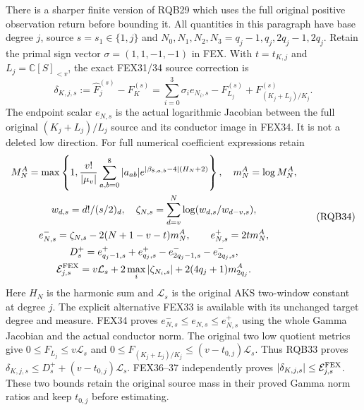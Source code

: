 \documentclass[10pt]{article}
\begin{document}
There is a sharper finite version of RQB29 which uses the full original
positive observation return before bounding it. All quantities in this
paragraph have base degree $j$, source $s=s_1\in\{1,j\}$ and
$N_0,N_1,N_2,N_3=q_j-1,q_j,2q_j-1,2q_j$.
Retain the primal sign vector $\sigma=(1,1,-1,-1)$ in FEX.
With $t=t_{K,j}$ and $L_j=\mathbb C[S]_{<v}$, the exact FEX31/34
source correction is
\[
 \delta_{K,j,s}:=\widehat F_j^{(s)}-F_K^{(s)}
       =\sum_{i=0}^3\sigma_i e_{N_i,s}
                    -F_{L_j}^{(s)}+F_{(K_j+L_j)/K_j}^{(s)} .
 \tag{RQB33}
\]
The endpoint scalar $e_{N,s}$ is the actual logarithmic Jacobian
between the full original $(K_j+L_j)/L_j$ source and its conductor
image in FEX34. It is not a deleted low direction. For full numerical
coefficient expressions retain
\[
\begin{gathered}
 M_N^A=\max\left\{1,\frac{v!}{|\mu_v|}
       \sum_{a,b=0}^8|a_{ab}|
         e^{|\beta_{8,a,b}-4|(H_N+2)}\right\},\quad m_N^A=\log M_N^A,\\
 w_{d,s}=d!/(s/2)_d,\quad
 \zeta_{N,s}=\sum_{d=v}^N\log(w_{d,s}/w_{d-v,s}),\\
 e^-_{N,s}=\zeta_{N,s}-2(N+1-v-t)m_N^A,\qquad
 e^+_{N,s}=2t m_N^A,\\
 D_s^+=e^+_{q_j-1,s}+e^+_{q_j,s}
                    -e^-_{2q_j-1,s}-e^-_{2q_j,s},\\
 \mathcal E_{j,s}^{\rm FEX}
       =v\mathcal L_s+2\max_i|\zeta_{N_i,s}|
                           +2(4q_j+1)m_{2q_j}^A .
\end{gathered}\tag{RQB34}
\]
Here $H_N$ is the harmonic sum and $\mathcal L_s$ is the original
AKS two-window constant at degree $j$. The explicit alternative
FEX33 is available with its unchanged target degree and measure.
FEX34 proves $e^-_{N,s}\le e_{N,s}\le e^+_{N,s}$ using the
whole Gamma Jacobian and the actual conductor norm.
The original two low quotient metrics give
$0\le F_{L_j}\le v\mathcal L_s$ and
$0\le F_{(K_j+L_j)/K_j}\le(v-t_{0,j})\mathcal L_s$.
Thus RQB33 proves
$\delta_{K,j,s}\le D_s^++(v-t_{0,j})\mathcal L_s$.
FEX36--37 independently proves
$|\delta_{K,j,s}|\le\mathcal E_{j,s}^{\rm FEX}$.
These two bounds retain the original source mass in their proved
Gamma norm ratios and keep $t_{0,j}$ before estimating.
\end{document}
